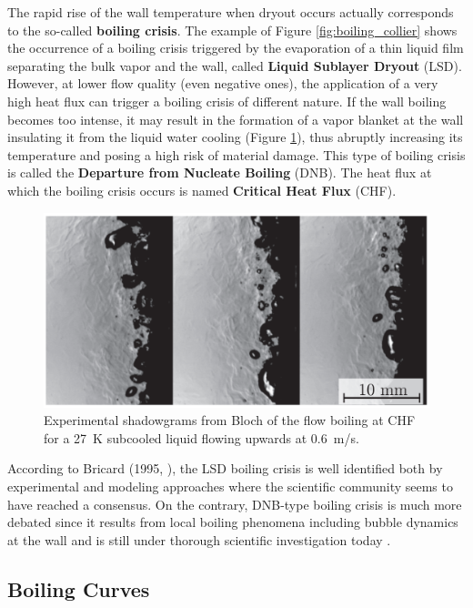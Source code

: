 The rapid rise of the wall temperature when dryout occurs actually corresponds to the so-called \textbf{boiling crisis}. The example of Figure \ref{fig:boiling_collier} shows the occurrence of a boiling crisis triggered by the evaporation of a thin liquid film separating the bulk vapor and the wall, called \textbf{Liquid Sublayer Dryout} (LSD). However, at lower flow quality (even negative ones), the application of a very high heat flux can trigger a boiling crisis of different nature. If the wall boiling becomes too intense, it may result in the formation of a vapor blanket at the wall insulating it from the liquid water cooling (Figure \ref{fig:dnb_bloch}), thus abruptly increasing its temperature and posing a high risk of material damage. This type of boiling crisis is called the \textbf{Departure from Nucleate Boiling} (DNB). The heat flux at which the boiling crisis occurs is named \textbf{Critical Heat Flux} (CHF).


\begin{figure}[!h]
\centering
\includegraphics[width=0.65\linewidth]{img/intro/dnb_bloch.png}
\caption{Experimental shadowgrams from Bloch \etal \cite{bloch} of the flow boiling at CHF for a 27\ K subcooled liquid flowing upwards at 0.6\ m/s.}
\label{fig:dnb_bloch}
\end{figure}

\npar

According to Bricard (1995, \cite{bricard_modelisation_1995}), the LSD boiling crisis is well identified both by experimental and modeling approaches \cite{hewitt_phenomenological_1990} where the scientific community seems to have reached a consensus. On the contrary, DNB-type boiling crisis is much more debated since it results from local boiling phenomena including bubble dynamics at the wall and is still under thorough scientific investigation today \cite{kossolapov_experimental_2021, demarly_new_2020, richenderfer_experimental_2018, bloch_study_2016, bloch_phenomenological_2013}.


\subsection{Boiling Curves}

